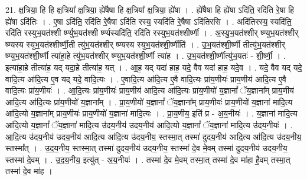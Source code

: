 \documentclass[17pt]{extarticle}
\begin{document}
21. क्ष॒त्रिया॒ हि हि क्ष॒त्रिया᳚ क्ष॒त्रिया॒ ह्ये॑षैषा हि क्ष॒त्रिया᳚ क्ष॒त्रिया॒ ह्ये॑षा । . ह्ये॑षैषा हि ह्ये॑षा ऽदि॑ति॒ रदि॑ति रे॒षा हि ह्ये॑षा ऽदि॑तिः । . ए॒षा ऽदि॑ति॒ रदि॑ति रे॒षैषा ऽदि॑ति रस्य॒ स्यदि॑ति रे॒षैषा ऽदि॑तिरसि । . अदि॑तिरस्य॒ स्यदि॑ति॒ रदि॑ति रस्युभ॒यत॑श्शी र्ष्ण्युभ॒यत॑श्शी र्ष्ण्यस्यदि॑ति॒ रदि॑ति रस्युभ॒यत॑श्शीर्ष्णी । . अ॒स्यु॒भ॒यत॑श्शीर् ष्ण्युभ॒यत॑श्शीर् ष्ण्यस्य स्युभ॒यत॑श्शीर्ष्णी॒ती त्यु॑भ॒यत॑श्शीर् 
ष्ण्यस्य स्युभ॒यत॑श्शी॒र्ष्णीति॑ । . उ॒भ॒यत॑श्शी॒र्ष्णी तीत्यु॑भ॒यत॑श्शीर् ष्ण्युभ॒यत॑श्शी॒र्ष्णी त्या॑हा॒हे त्यु॑भ॒यत॑श्शीर् 
ष्ण्युभ॒यत॑श्शी॒र्ष्णी त्या॑ह । . उ॒भ॒यत॑श्शी॒र्ष्णीत्यु॑भ॒यतः॑ - शी॒र्ष्णी॒ । . इत्या॑हा॒हे तीत्या॑ह॒ यद् यदा॒हे तीत्या॑ह॒ यत् । . आ॒ह॒ यद् यदा॑ हाह॒ यदे॒ वैव यदा॑ हाह॒ यदे॒व । . यदे॒ वैव यद् यदे॒ वादि॒त्य आ॑दि॒त्य ए॒व यद् यदे॒ वादि॒त्यः । . ए॒वादि॒त्य आ॑दि॒त्य ए॒वै वादि॒त्यः प्रा॑य॒णीयः॑ प्राय॒णीय॑ आदि॒त्य ए॒वै वादि॒त्यः प्रा॑य॒णीयः॑ । . आ॒दि॒त्यः प्रा॑य॒णीयः॑ प्राय॒णीय॑ आदि॒त्य आ॑दि॒त्यः प्रा॑य॒णीयो॑ य॒ज्ञानां᳚ ॅय॒ज्ञाना᳚म् प्राय॒णीय॑ आदि॒त्य आ॑दि॒त्यः प्रा॑य॒णीयो॑ य॒ज्ञाना᳚म् । . प्रा॒य॒णीयो॑ य॒ज्ञानां᳚ ॅय॒ज्ञाना᳚म् प्राय॒णीयः॑ प्राय॒णीयो॑ य॒ज्ञाना॑ मादि॒त्य आ॑दि॒त्यो य॒ज्ञाना᳚म् प्राय॒णीयः॑ प्राय॒णीयो॑ य॒ज्ञाना॑ मादि॒त्यः । . प्रा॒य॒णीय॒ इति॑ प्र - अ॒य॒नीयः॑ । . य॒ज्ञाना॑ मादि॒त्य आ॑दि॒त्यो य॒ज्ञानां᳚ ॅय॒ज्ञाना॑ मादि॒त्य उ॑दय॒नीय॑ उदय॒नीय॑ आदि॒त्यो य॒ज्ञानां᳚ ॅय॒ज्ञाना॑ मादि॒त्य उ॑दय॒नीयः॑ । . आ॒दि॒त्य उ॑दय॒नीय॑ उदय॒नीय॑ आदि॒त्य आ॑दि॒त्य उ॑दय॒नीय॒ स्तस्मा॒त् तस्मा॑ दुदय॒नीय॑ आदि॒त्य आ॑दि॒त्य उ॑दय॒नीय॒ स्तस्मा᳚त् । . उ॒द॒य॒नीय॒ स्तस्मा॒त् तस्मा॑ दुदय॒नीय॑ उदय॒नीय॒ स्तस्मा॑ दे॒व मे॒वम् तस्मा॑ दुदय॒नीय॑ उदय॒नीय॒ स्तस्मा॑ दे॒वम् । . उ॒द॒य॒नीय॒ इत्यु॑त् - अ॒य॒नीयः॑ । . तस्मा॑ दे॒व मे॒वम् तस्मा॒त् तस्मा॑ दे॒व मा॑हा है॒वम् तस्मा॒त् तस्मा॑ दे॒व मा॑ह । \newline
\end{document}
